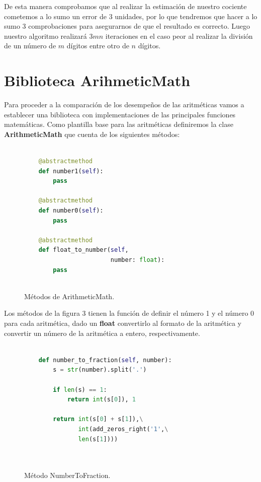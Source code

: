 \documentclass[a4paper,10pt,twocolumn]{article}
\begin{document}
De esta manera comprobamos que al realizar la estimación de nuestro cociente cometemos a lo sumo un error de 3 unidades, por lo que tendremos que hacer a lo sumo 3 comprobaciones para asegurarnos de que el resultado es correcto. Luego nuestro algoritmo realizará $3mn$ iteraciones en el caso peor al realizar la división de un número de $m$ dígitos entre otro de $n$ dígitos. 

\section{Biblioteca ArihmeticMath}\label{suc:arithmetic_math}
Para proceder a la comparación de los desempeños de las aritméticas vamos a establecer una biblioteca con implementaciones de las principales funciones matemáticas. Como plantilla base para las aritméticas definiremos la clase \textbf{ArithmeticMath} que cuenta de los siguientes métodos:


\begin{figure}[htb]%
	\begin{lstlisting}[language=python]%

    @abstractmethod
    def number1(self):
        pass

    @abstractmethod
    def number0(self):
        pass
        
    @abstractmethod
    def float_to_number(self, 
                        number: float):
        pass
		
		\end{lstlisting}
	\caption{Métodos de ArithmeticMath.\label{fig:code}}
\end{figure}

Los métodos de la figura 3 tienen la función de definir el número 1 y el número 0 para cada aritmética, dado un \textbf{float} convertirlo al formato de la aritmética y convertir un número de la aritmética a entero, respectivamente.

\begin{figure}[htb]%
	\begin{lstlisting}[language=python]%

    def number_to_fraction(self, number):
        s = str(number).split('.')

        if len(s) == 1:
            return int(s[0]), 1

        return int(s[0] + s[1]),\
               int(add_zeros_right('1',\
               len(s[1])))

		
		\end{lstlisting}
	\caption{Método NumberToFraction.\label{fig:code}}
\end{figure}
\end{document}
